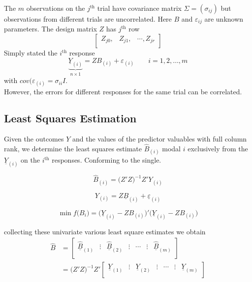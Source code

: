 \documentclass[11pt,a4paper]{article}
\theoremstyle{definition}
\begin{document}
The $m$ observations on the $j^{\text{th}}$ trial have covariance matrix $\Sigma=(\sigma_{ij})$ but observations from different trials are uncorrelated. Here $B$ and $\varepsilon_{ij}$ are unknown parameters. The design matrix $Z$ has $j^{\text{th}}$ row $$
\begin{bmatrix}
Z_{j0}, & Z_{j1}, & \cdots, Z_{jr}\\
\end{bmatrix}
$$ 
Simply stated the $i^{\text{th}}$ response
\begin{equation}\tag{3}
\underbrace{\underline{Y}_{(i)}}_{n\times 1}= ZB_{(i)} + \varepsilon_{(i)}\qquad i=1,2,\ldots, m
\end{equation} with $cov(\varepsilon_{(i)} = \sigma_{ii}I$.\\

However, the errors for different responses for the same trial can be correlated.\\

\subsection{Least Squares Estimation}
Given the outcomes $Y$ and the values of the predictor valuables with full column rank, we determine the least squares estimate $\widehat{B}_{(i)}$ modal $i$ exclusively from the $\underline{Y}_{(i)}$ on the $i^{\text{th}}$ responses. Conforming to the single.

\begin{equation}\tag{4}
\widehat{B}_{(i)} = \big(Z'Z\big)^{-1}Z'Y_{(i)}
\end{equation}

$$Y_{(i)} = Z\underline{B}_{(i)} + \underline{\varepsilon}_{(i)}$$

$$\min f\big(B_i\big) = \big(\underline{Y}_{(i)}-ZB_{(i)}\big)'\big(\underline{Y}_{(i)}-ZB_{(i)}\big)$$

collecting these univariate various least square estimates we obtain
\begin{align*}
\widehat{B} & = \begin{bmatrix}
\widehat{\underline{B}}_{(1)} & \vdots & \widehat{\underline{B}}_{(2)} & \vdots & \cdots& \vdots & \widehat{\underline{B}}_{(m)}\\
\end{bmatrix}\\
       & = \big(Z'Z\big)^{-1}Z'\begin{bmatrix}
       \underline{Y}_{(1)} & \vdots & \underline{Y}_{(2)} & \vdots & \cdots& \vdots & \underline{Y}_{(m)}\\
       \end{bmatrix}
\end{align*}
  
\end{document}
